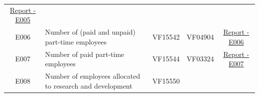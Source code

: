 \documentclass[]{book}
\begin{document}
\begin{longtable}[]{@{}clccc@{}}
\begin{minipage}[t]{0.20\columnwidth}
\href{./Auxiliary\%20Files/technical_reports/variable_report/E005.pdf}{Report - E005}\strut
\end{minipage}\tabularnewline
\begin{minipage}[t]{0.10\columnwidth}\centering
E006\strut
\end{minipage} & \begin{minipage}[t]{0.25\columnwidth}\raggedright
Number of (paid and unpaid) part-time employees\strut
\end{minipage} & \begin{minipage}[t]{0.12\columnwidth}\centering
VF15542\strut
\end{minipage} & \begin{minipage}[t]{0.19\columnwidth}\centering
VF04904\strut
\end{minipage} & \begin{minipage}[t]{0.20\columnwidth}\centering
\href{./Auxiliary\%20Files/technical_reports/variable_report/E006.pdf}{Report - E006}\strut
\end{minipage}\tabularnewline
\begin{minipage}[t]{0.10\columnwidth}\centering
E007\strut
\end{minipage} & \begin{minipage}[t]{0.25\columnwidth}\raggedright
Number of paid part-time employees\strut
\end{minipage} & \begin{minipage}[t]{0.12\columnwidth}\centering
VF15544\strut
\end{minipage} & \begin{minipage}[t]{0.19\columnwidth}\centering
VF03324\strut
\end{minipage} & \begin{minipage}[t]{0.20\columnwidth}\centering
\href{./Auxiliary\%20Files/technical_reports/variable_report/E007.pdf}{Report - E007}\strut
\end{minipage}\tabularnewline
\begin{minipage}[t]{0.10\columnwidth}\centering
E008\strut
\end{minipage} & \begin{minipage}[t]{0.25\columnwidth}\raggedright
Number of employees allocated to research and development\strut
\end{minipage} & \begin{minipage}[t]{0.12\columnwidth}\centering
VF15550\strut
\end{minipage} & \begin{minipage}[t]{0.19\columnwidth}\centering

\end{minipage}
\end{longtable}
\end{document}
